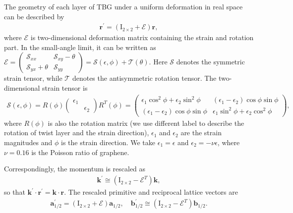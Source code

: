 \documentclass[10pt, oneside]{article}
\newcommand{\te}{\theta}
\newcommand{\pr}{\prime}
\newcommand{\mr}[1]{\mathrm{#1}}
\newcommand{\p}[1]{\left(#1\right)}
\begin{document}
The geometry of each layer of TBG under a uniform deformation in real space can be described by
\begin{align}
	\bm{r}^\pr = \p{\mr{I}_{2 \times 2} + \mathcal{E}} \bm{r},
\end{align}
where \(\mathcal{E}\) is two-dimensional deformation matrix containing the strain and rotation part. In the small-angle limit, it can be written as \(\mathcal{E} = \begin{pmatrix}
		\mathcal{S}_{xx} & \mathcal{S}_{xy} - \te\\
		\mathcal{S}_{yx} + \te & \mathcal{S}_{yy}
 	\end{pmatrix} = \mathcal{S}\p{\epsilon, \phi} + \mathcal{T} \p{\te}.\)
Here \(\mathcal{S}\) denotes the symmetric strain tensor, while \(\mathcal{T}\) denotes the antisymmetric rotation tensor. The two-dimensional strain tensor is
\begin{align}
	\mathcal{S} \p{\epsilon, \phi} = R \p{\phi} \begin{pmatrix}
		\epsilon_1 & \\
		& \epsilon_2
	\end{pmatrix} R^{T} \p{\phi} = \begin{pmatrix}
		\epsilon_1 \cos^{2} \phi + \epsilon_2 \sin^2 \phi  & \p{\epsilon_1 - \epsilon_2} \cos \phi \sin \phi\\
		\p{\epsilon_1 - \epsilon_2} \cos \phi \sin \phi & \epsilon_1 \sin^2 \phi + \epsilon_2 \cos^2 \phi
	\end{pmatrix},
\end{align}
where \(R \p{\phi}\) is also the rotation matrix (we use different label to describe the rotation of twist layer and the strain direction), \(\epsilon_1\) and \(\epsilon_2\) are the strain magnitudes and \(\phi\) is the strain direction. We take \(\epsilon_1=\epsilon\) and \(\epsilon_2=-\nu\epsilon\), where \(\nu=0.16\) is the Poisson ratio of graphene.

Correspondingly, the momentum is rescaled as
\begin{align}
	\bm{k}^\pr \cong \p{\mr{I}_{2 \times 2} - \mathcal{E}^{T}} \bm{k},
\end{align}
so that \(\bm{k}^\pr \cdot \bm{r}^\pr = \bm{k} \cdot \bm{r}\). The rescaled primitive and reciprocal lattice vectors are 
\begin{align}
	\bm{a}^{\pr}_{1/2} = \p{\mr{I}_{2 \times 2} + \mathcal{E}} \bm{a}_{1/2}, \quad \bm{b}^{\pr}_{1/2} \cong \p{\mr{I}_{2 \times 2} - \mathcal{E}^{T}} \bm{b}_{1/2}.
\end{align}
\end{document}
